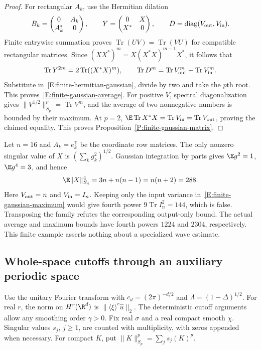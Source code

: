 \begin{proof}
  For rectangular $A_k$, use the Hermitian dilation
  \[
    B_k=\begin{pmatrix}0&A_k\\A_k^*&0\end{pmatrix},\qquad
    Y=\begin{pmatrix}0&X\\X^*&0\end{pmatrix},\qquad
    D=\operatorname{diag}(V_{\rm out},V_{\rm in}).
  \]
  Finite entrywise summation proves $\operatorname{Tr}(UV)=\operatorname{Tr}(VU)$
  for compatible rectangular matrices. Since
  $(XX^*)^m=X(X^*X)^{m-1}X^*$, it follows that
  \[
    \operatorname{Tr}Y^{2m}=2\operatorname{Tr}((X^*X)^m),\qquad
    \operatorname{Tr}D^m=\operatorname{Tr}V_{\rm out}^m+
    \operatorname{Tr}V_{\rm in}^m.
  \]
  Substitute in~\eqref{E:finite-hermitian-gaussian}, divide by two and
  take the $p$th root. This proves~\eqref{E:finite-gaussian-average}.
  For positive $V$, spectral diagonalization gives
  $\|V^{1/2}\|_{S_p}^p=\operatorname{Tr}V^m$, and the average of two
  nonnegative numbers is bounded by their maximum. At $p=2$,
  $\E\operatorname{Tr}X^*X=\operatorname{Tr}V_{\rm in}
  =\operatorname{Tr}V_{\rm out}$, proving the claimed equality.
  This proves Proposition~\ref{P:finite-gaussian-matrix}.
\end{proof}

\begin{remark}
  \label{R:gaussian-one-variance-test}
  Let $n=16$ and $A_k=e_k^{\mathsf T}$ be the coordinate row matrices.
  The only nonzero singular value of $X$ is $(\sum_k g_k^2)^{1/2}$.
  Gaussian integration by parts gives $\E g^2=1$, $\E g^4=3$, and hence
  \[
    \E\|X\|_{S_4}^4=3n+n(n-1)=n(n+2)=288.
  \]
  Here $V_{\rm out}=n$ and $V_{\rm in}=I_n$. Keeping only the input
  variance in~\eqref{E:finite-gaussian-maximum} would give fourth power
  $9\operatorname{Tr}I_n^2=144$, which is false. Transposing the family
  refutes the corresponding output-only bound. The actual average and
  maximum bounds have fourth powers $1224$ and $2304$, respectively.
  This finite example asserts nothing about a specialized wave estimate.
\end{remark}

\subsection{Whole-space cutoffs through an auxiliary periodic space}

Use the unitary Fourier transform with $c_d=(2\pi)^{-d/2}$ and
$\Lambda=(1-\Delta)^{1/2}$. For real $r$, the norm on $H^r(\R^d)$ is
$\|\langle\xi\rangle^r\widehat u\|_2$. The deterministic cutoff arguments
allow any smoothing order $\gamma > 0$. Fix real $\sigma$ and a real compact
smooth $\chi$.
Singular values $s_j$, $j \ge 1$, are counted with multiplicity, with zeros
appended when necessary. For compact $K$, put
$\|K\|_{S_p}^p=\sum_j s_j(K)^p$.

